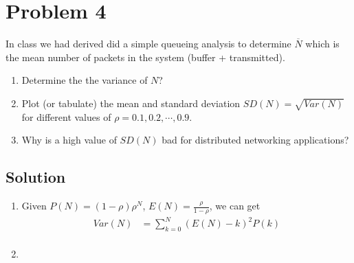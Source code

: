 
\section*{Problem 4}

In class we had derived did a simple queueing analysis to determine $\overline{N}$ which is the mean number of packets
in the system (buffer + transmitted).

\begin{enumerate}
    \item Determine the the variance of $N$?
    \item Plot (or tabulate) the mean and standard deviation $SD(N) = \sqrt{Var(N)}$ for different values of $\rho = 0.1, 0.2, \cdots , 0.9$.
    \item Why is a high value of $SD(N)$ bad for distributed networking applications?
\end{enumerate}

\subsection*{Solution}

\begin{enumerate}
    \item Given $P(N) = (1-\rho)\rho^N$, $E(N) = \frac{\rho}{1-\rho}$, we can get
          \begin{align*}
              Var(N) & = \sum_{k=0}^N (E(N) - k)^2 P(k) \\
          \end{align*}
    \item
\end{enumerate}